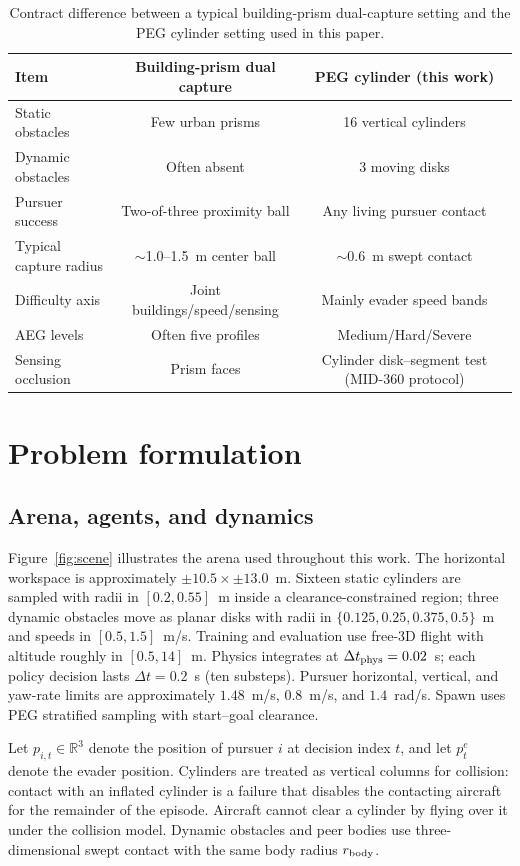 \documentclass{SCIS2026}
\begin{document}
\begin{table}[H]
\footnotesize
\caption{Contract difference between a typical building-prism dual-capture setting and the PEG cylinder setting used in this paper.}
\label{tab:contract}
\begin{tabularx}{\textwidth}{Xcc}
\toprule
Item & Building-prism dual capture & PEG cylinder (this work) \\\hline
Static obstacles & Few urban prisms & 16 vertical cylinders \\
Dynamic obstacles & Often absent & 3 moving disks \\
Pursuer success & Two-of-three proximity ball & Any living pursuer contact \\
Typical capture radius & $\sim$1.0--1.5~m center ball & $\sim$0.6~m swept contact \\
Difficulty axis & Joint buildings/speed/sensing & Mainly evader speed bands \\
AEG levels & Often five profiles & Medium/Hard/Severe \\
Sensing occlusion & Prism faces & Cylinder disk--segment test (MID-360 protocol) \\
\bottomrule
\end{tabularx}
\end{table}

\section{Problem formulation}
\subsection{Arena, agents, and dynamics}
Figure~\ref{fig:scene} illustrates the arena used throughout this work. The horizontal workspace is approximately $\pm10.5\times\pm13.0$~m. Sixteen static cylinders are sampled with radii in $[0.2,0.55]$~m inside a clearance-constrained region; three dynamic obstacles move as planar disks with radii in $\{0.125,0.25,0.375,0.5\}$~m and speeds in $[0.5,1.5]$~m/s. Training and evaluation use free-3D flight with altitude roughly in $[0.5,14]$~m. Physics integrates at $\Delta t_{\rm phys}=0.02$~s; each policy decision lasts $\Delta t=0.2$~s (ten substeps). Pursuer horizontal, vertical, and yaw-rate limits are approximately $1.48$~m/s, $0.8$~m/s, and $1.4$~rad/s. Spawn uses PEG stratified sampling with start--goal clearance.

Let $p_{i,t}\in\mathbb{R}^3$ denote the position of pursuer $i$ at decision index $t$, and let $p^e_t$ denote the evader position. Cylinders are treated as vertical columns for collision: contact with an inflated cylinder is a failure that disables the contacting aircraft for the remainder of the episode. Aircraft cannot clear a cylinder by flying over it under the collision model. Dynamic obstacles and peer bodies use three-dimensional swept contact with the same body radius $r_{\rm body}$.
\end{document}
